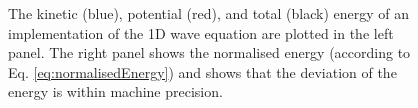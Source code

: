 {{\begin{figure}[h]
      \caption{The kinetic (blue), potential (red), and total (black) energy of an implementation of the 1D wave equation are plotted in the left panel. The right panel shows the normalised energy (according to Eq. \eqref{eq:normalisedEnergy}) and shows that the deviation of the energy is within machine precision. \label{fig:energy1DWave}}
\end{figure}

}}
